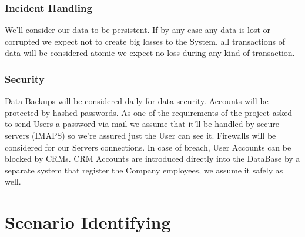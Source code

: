 \documentclass[a4paper]{article}
\begin{document}
\subsubsection{Incident Handling}
We'll consider our data to be persistent. If by any case any data is lost or corrupted we expect not to create big losses to the System, all transactions of data will be considered atomic we expect no loss during any kind of transaction. 

\subsubsection{Security}
Data Backups will be considered daily for data security. Accounts will be protected by hashed passwords. As one of the requirements of the project asked to send Users a password via mail we assume that it'll be handled by secure servers (IMAPS) so we're assured just the User can see it. Firewalls will be considered for our Servers connections. In case of breach, User Accounts can be blocked by CRMs. CRM Accounts are introduced directly into the DataBase by a separate system that register the Company employees, we assume it safely as well.

\section{Scenario Identifying}
\end{document}
